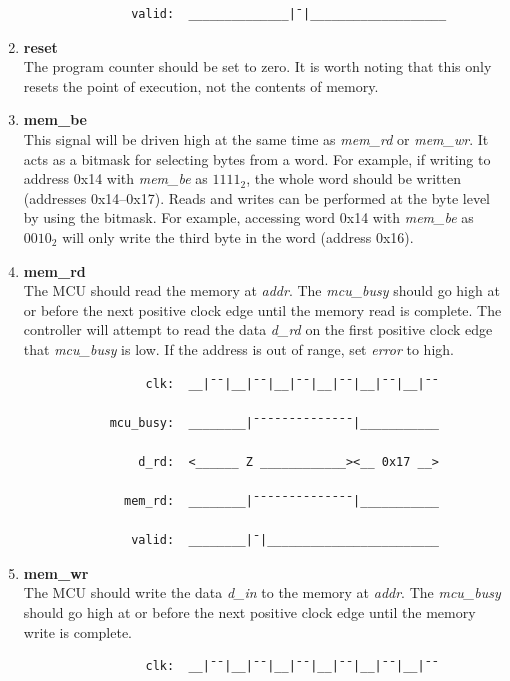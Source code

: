 \documentclass[10pt,a4paper]{article}
\begin{document}
\begin{enumerate}
\begin{verbatim}
               valid:  ______________|¯|___________________
        \end{verbatim}

    \item\textbf{reset}\\
    The program counter should be set to zero. It is worth noting that this only resets the point of
    execution, not the contents of memory.

    \item\textbf{mem\_be}\\
    This signal will be driven high at the same time as \emph{mem\_rd} or \emph{mem\_wr}. It acts as
    a bitmask for selecting bytes from a word. For example, if writing to address 0x14 with
    \emph{mem\_be} as $1111_{2}$, the whole word should be written (addresses 0x14--0x17).
    Reads and writes can be performed at the byte level by using the
    bitmask. For example, accessing word 0x14 with \emph{mem\_be} as $0010_{2}$ will
    only write the third byte in the word (address 0x16).

    \newpage
    \item\textbf{mem\_rd}\\
    The MCU should read the memory at \emph{addr}. The \emph{mcu\_busy} should go
     high at or before the next positive clock edge until the memory read is complete. The
    controller will attempt to read the data \emph{d\_rd} on the first positive clock edge that
    \emph{mcu\_busy} is low. If the address is out of range, set \emph{error} to high.

        \begin{verbatim}
                 clk:  __|¯¯|__|¯¯|__|¯¯|__|¯¯|__|¯¯|__|¯¯

            mcu_busy:  ________|¯¯¯¯¯¯¯¯¯¯¯¯¯¯|___________

                d_rd:  <______ Z ____________><__ 0x17 __>

              mem_rd:  ________|¯¯¯¯¯¯¯¯¯¯¯¯¯¯|___________

               valid:  ________|¯|________________________
        \end{verbatim}

    \item\textbf{mem\_wr}\\
    The MCU should write the data \emph{d\_in} to the memory at \emph{addr}. The \emph{mcu\_busy}
    should go high at or before the next positive clock edge until the memory write is complete.

        \begin{verbatim}
                 clk:  __|¯¯|__|¯¯|__|¯¯|__|¯¯|__|¯¯|__|¯¯


\end{verbatim}
\end{enumerate}
\end{document}
